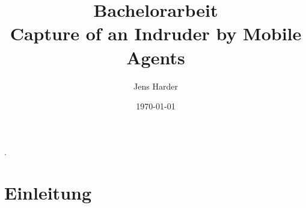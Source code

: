 \documentclass{article}
\title{Bachelorarbeit\\
	Capture of an Indruder by Mobile Agents}
\author{Jens Harder}
\date{\today}
\begin{document}
	\maketitle
	\newpage
	
	.
	\tableofcontents
	
	\newpage
	
	\section{Einleitung}
	
	
\end{document}
